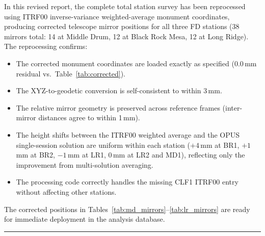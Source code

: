 \documentclass[11pt,letterpaper]{article}
\begin{document}
In this revised report, the complete total station survey has been reprocessed using ITRF00 inverse-variance weighted-average monument coordinates, producing corrected telescope mirror positions for all three FD stations (38 mirrors total: 14 at Middle Drum, 12 at Black Rock Mesa, 12 at Long Ridge). The reprocessing confirms:

\begin{itemize}[nosep]
\item The corrected monument coordinates are loaded exactly as specified (0.0\,mm residual vs.\ Table~\ref{tab:corrected}).
\item The XYZ-to-geodetic conversion is self-consistent to within 3\,mm.
\item The relative mirror geometry is preserved across reference frames (inter-mirror distances agree to within 1\,mm).
\item The height shifts between the ITRF00 weighted average and the OPUS single-session solution are uniform within each station ($+4$\,mm at BR1, $+1$\,mm at BR2, $-1$\,mm at LR1, 0\,mm at LR2 and MD1), reflecting only the improvement from multi-solution averaging.
\item The processing code correctly handles the missing CLF1 ITRF00 entry without affecting other stations.
\end{itemize}

\noindent The corrected positions in Tables~\ref{tab:md_mirrors}--\ref{tab:lr_mirrors} are ready for immediate deployment in the analysis database.

\vspace{1cm}
\noindent\rule{\textwidth}{0.4pt}
\end{document}
